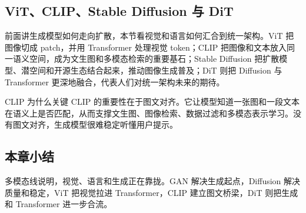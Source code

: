 \subsection{ViT、CLIP、Stable Diffusion 与 DiT}

前面讲生成模型如何走向扩散，本节看视觉和语言如何汇合到统一架构。ViT 把图像切成 patch，并用 Transformer 处理视觉 token；CLIP 把图像和文本放入同一语义空间，成为文生图和多模态检索的重要基石；Stable Diffusion 把扩散模型、潜空间和开源生态结合起来，推动图像生成普及；DiT 则把 Diffusion 与 Transformer 更深地融合，代表人们对统一架构未来的期待。

\begin{importantbox}{CLIP 为什么关键}
CLIP 的重要性在于图文对齐。它让模型知道一张图和一段文本在语义上是否匹配，从而支撑文生图、图像检索、数据过滤和多模态表示学习。没有图文对齐，生成模型很难稳定听懂用户提示。
\end{importantbox}

\subsection{本章小结}

多模态线说明，视觉、语言和生成正在靠拢。GAN 解决生成起点，Diffusion 解决质量和稳定，ViT 把视觉拉进 Transformer，CLIP 建立图文桥梁，DiT 则把生成和 Transformer 进一步合流。


